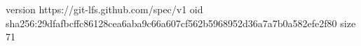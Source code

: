 version https://git-lfs.github.com/spec/v1
oid sha256:29dfafbcffc86128cea6aba9c66a607cf562b5968952d36a7a7b0a582efe2f80
size 71
